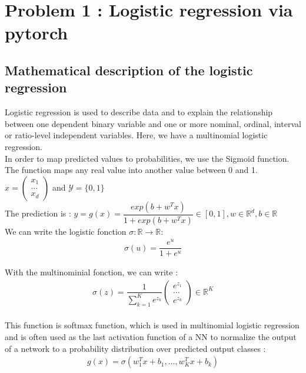 \section{Problem 1 : Logistic regression via pytorch}

\subsection{Mathematical description of the logistic regression} 

Logistic regression is used to describe data and to explain the relationship between one dependent binary variable and one or more nominal, ordinal, interval or ratio-level independent variables. Here, we have a multinomial logistic regression. \\
In order to map predicted values to probabilities, we use the Sigmoid function. The function maps any real value into another value between 0 and 1. \\ 

$x = \begin{pmatrix}
	x_1 \\
	\dots \\
	x_d 
\end{pmatrix}$ and $\mathcal{Y} = \{0,1\}$ \\

The prediction is : $y = g(x)=\dfrac{exp(b+w^{T}x)}{1+exp(b+w^{T}x)} \in [0,1], w\in\mathbb{R}^{d}, b\in \mathbb{R}$ \\

We can write the logistic fonction $\sigma : \mathbb{R} \longrightarrow \mathbb{R}$:
\begin{align*}	
	\sigma(u) = \dfrac{e^{u}}{1+e^{u}}
\end{align*}

With the multinominial fonction, we can write : 
\begin{align*}	
	\sigma(z)=\dfrac{1}{\sum_{k=1}^{K}e^{z_{k}}}\begin{pmatrix}
		e^{z_{1}} \\
		\dots \\
		e^{z_{k}}
	\end{pmatrix} \in \mathbb{R}^{K}
\end{align*} \\



This function is softmax function, which is used in multinomial logistic regression and is often used as the last activation function of a NN to normalize the output of a network to a probability distribution over predicted output classes : 
\begin{align*}
	g(x) = \sigma(w^{T}_{1}x+b_{1}, \dots, w_{K}^{T}x+b_{k})
\end{align*}

